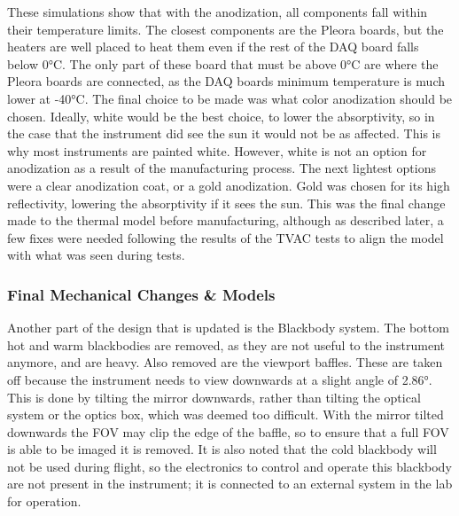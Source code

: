These simulations show that with the anodization, all components fall within their temperature limits. The closest components are the Pleora boards, but the heaters are well placed to heat them even if the rest of the DAQ board falls below 0°C. The only part of these board that must be above 0°C are where the Pleora boards are connected, as the DAQ boards minimum temperature is much lower at -40°C. The final choice to be made was what color anodization should be chosen. Ideally, white would be the best choice, to lower the absorptivity, so in the case that the instrument did see the sun it would not be as affected. This is why most instruments are painted white. However, white is not an option for anodization as a result of the manufacturing process. The next lightest options were a clear anodization coat, or a gold anodization. Gold was chosen for its high reflectivity, lowering the absorptivity if it sees the sun. This was the final change made to the thermal model before manufacturing, although as described later, a few fixes were needed following the results of the TVAC tests to align the model with what was seen during tests.

\subsubsection{Final Mechanical Changes \& Models}\label{Mech_changes}
Another part of the design that is updated is the Blackbody system. The bottom hot and warm blackbodies are removed, as they are not useful to the instrument anymore, and are heavy. Also removed are the viewport baffles. These are taken off because the instrument needs to view downwards at a slight angle of 2.86°. This is done by tilting the mirror downwards, rather than tilting the optical system or the optics box, which was deemed too difficult. With the mirror tilted downwards the FOV may clip the edge of the baffle, so to ensure that a full FOV is able to be imaged it is removed. It is also noted that the cold blackbody will not be used during flight, so the electronics to control and operate this blackbody are not present in the instrument; it is connected to an external system in the lab for operation.

